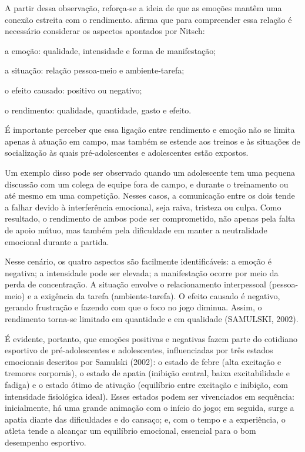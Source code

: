 \begin{Desenvolvimento}
A partir dessa observação, reforça-se a ideia de que as emoções mantêm uma conexão estreita com o rendimento.  afirma que para compreender essa relação é necessário considerar os aspectos apontados por Nitsch:
\begin{alinea}
  \item a emoção: qualidade, intensidade e forma de manifestação;
  \item a situação: relação pessoa-meio e ambiente-tarefa;
  \item o efeito causado: positivo ou negativo;
  \item o rendimento: qualidade, quantidade, gasto e efeito.  
\end{alinea}

É importante perceber que essa ligação entre rendimento e emoção não se limita apenas à atuação em campo, mas também se estende aos treinos e às situações de socialização às quais pré-adolescentes e adolescentes estão expostos.

Um exemplo disso pode ser observado quando um adolescente tem uma pequena discussão com um colega de equipe fora de campo, e durante o treinamento ou até mesmo em uma competição. Nesses casos, a comunicação entre os dois tende a falhar devido à interferência emocional, seja raiva, tristeza ou culpa. Como resultado, o rendimento de ambos pode ser comprometido, não apenas pela falta de apoio mútuo, mas também pela dificuldade em manter a neutralidade emocional durante a partida.

Nesse cenário, os quatro aspectos são facilmente identificáveis: a emoção é negativa; a intensidade pode ser elevada; a manifestação ocorre por meio da perda de concentração. A situação envolve o relacionamento interpessoal (pessoa-meio) e a exigência da tarefa (ambiente-tarefa). O efeito causado é negativo, gerando frustração e fazendo com que o foco no jogo diminua. Assim, o rendimento torna-se limitado em quantidade e em qualidade (SAMULSKI, 2002).

É evidente, portanto, que emoções positivas e negativas fazem parte do cotidiano esportivo de pré-adolescentes e adolescentes, influenciadas por três estados emocionais descritos por Samulski (2002): o estado de febre (alta excitação e tremores corporais), o estado de apatia (inibição central, baixa excitabilidade e fadiga) e o estado ótimo de ativação (equilíbrio entre excitação e inibição, com intensidade fisiológica ideal). Esses estados podem ser vivenciados em sequência: inicialmente, há uma grande animação com o início do jogo; em seguida, surge a apatia diante das dificuldades e do cansaço; e, com o tempo e a experiência, o atleta tende a alcançar um equilíbrio emocional, essencial para o bom desempenho esportivo.


\end{Desenvolvimento}
